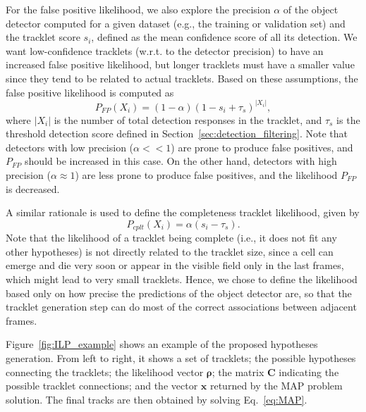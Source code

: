 \documentclass{article}
\begin{document}
For the false positive likelihood, we also explore the precision $\alpha$ of the object detector computed for a given dataset (e.g., the training or validation set) and the tracklet score $s_i$, defined as the mean confidence score of all its detection. We want low-confidence tracklets (w.r.t. to the detector precision) to have an increased false positive likelihood, but longer tracklets must have a smaller value since they tend to be related to actual tracklets. Based on these assumptions, the false positive likelihood is computed as
\begin{equation}
    P_{FP}(X_i) = (1-\alpha)(1-s_i+\tau_s)^{|X_i|},
\end{equation}
where $|X_i|$ is the number of total detection responses in the tracklet, and $\tau_s$ is the threshold detection score defined in Section~\ref{sec:detection_filtering}. Note that detectors with low precision (${\alpha<\!\!<1}$) are prone to produce false positives, and $P_{FP}$ should be increased in this case. On the other hand, detectors with high precision (${\alpha \approx 1}$) are less prone to produce false positives, and the likelihood $P_{FP}$ is decreased.

A similar rationale is used to define the completeness tracklet likelihood, given by
\begin{equation}
    P_{cplt}(X_i) = \alpha (s_i - \tau_s).
\end{equation}
Note that the likelihood of a tracklet being complete (i.e., it does not fit any other hypotheses) is not directly related to the tracklet size, since a cell can emerge and die very soon or appear in the visible field only in the last frames, which might lead to very small tracklets. Hence, we chose to define the likelihood based only on how precise the predictions of the object detector are, so that the tracklet generation step can do most of the correct associations between adjacent frames.


Figure~\ref{fig:ILP_example} shows an example of the proposed hypotheses generation. From left to right, it shows a set of tracklets; the possible hypotheses connecting the tracklets; the likelihood vector $\bm{\rho}$; the matrix $\bm{C}$ indicating the possible tracklet connections; and the vector $\bm{x}$ returned by the MAP problem solution. The final tracks are then obtained by solving Eq.~\eqref{eq:MAP}.
\end{document}
